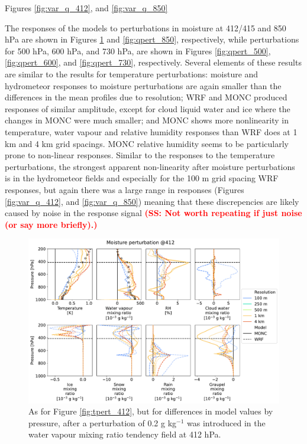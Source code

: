 \documentclass[draft]{agujournal2019}
\newcommand{\todo}[1]{\textcolor{red}{\textbf{(#1)}}}
\begin{document}
Figures \ref{fig:var_q_412}, and \ref{fig:var_q_850}

The responses of the models to perturbations in moisture at 412/415 and 850 hPa are shown in Figures \ref{fig:qpert_412} and
\ref{fig:qpert_850}, respectively, while perturbations for 500 hPa, 600 hPa, and
730 hPa, are shown in Figures \ref{fig:qpert_500}, \ref{fig:qpert_600}, and
\ref{fig:qpert_730}, respectively. Several elements of these results are similar
to the results for temperature perturbations: moisture and hydrometeor responses
to moisture perturbations are again smaller than the differences in the mean profiles due
to resolution; WRF and MONC produced responses of similar amplitude, except for
cloud liquid water and ice where the changes in MONC were much smaller; and MONC shows more nonlinearity in temperature, water vapour and relative humidity responses than WRF does
at 1 km and 4 km grid spacings. MONC relative humidity seems to
be particularly prone to non-linear responses. Similar to the responses to the
temperature perturbations, the strongest apparent non-linearity after moisture
perturbations is in the hydrometeor fields and especially for the 100 m grid
spacing WRF responses, but again there was a large range in responses (Figures
\ref{fig:var_q_412}, and \ref{fig:var_q_850}) meaning that these discrepencies
are likely caused by noise in the response signal \todo{SS: Not worth repeating if just noise (or say more briefly).}

\begin{figure}[pth]
    \noindent\includegraphics[width=\textwidth]{figures/pert_diffs_q_0.0002_@412}
    \caption{As for Figure \ref{fig:tpert_412}, but for differences in model
    values by pressure, after a perturbation of 0.2 g kg$^{-1}$ was introduced
    in the water vapour mixing ratio tendency field at 412 hPa.}
    \label{fig:qpert_412}
\end{figure}
\end{document}
